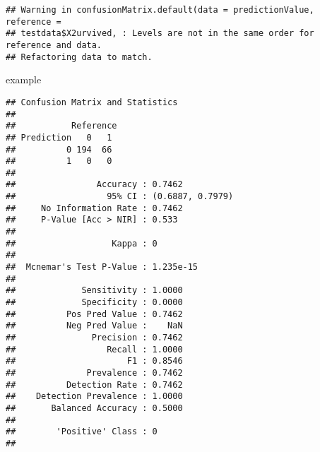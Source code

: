 \documentclass[
]{article}
\newenvironment{Shaded}{\begin{snugshade}}{\end{snugshade}}
\newcommand{\AttributeTok}[1]{\textcolor[rgb]{0.13,0.29,0.53}{#1}}
\newcommand{\DecValTok}[1]{\textcolor[rgb]{0.00,0.00,0.81}{#1}}
\newcommand{\FloatTok}[1]{\textcolor[rgb]{0.00,0.00,0.81}{#1}}
\newcommand{\FunctionTok}[1]{\textcolor[rgb]{0.13,0.29,0.53}{\textbf{#1}}}
\newcommand{\NormalTok}[1]{#1}
\newcommand{\OtherTok}[1]{\textcolor[rgb]{0.56,0.35,0.01}{#1}}
\newcommand{\SpecialCharTok}[1]{\textcolor[rgb]{0.81,0.36,0.00}{\textbf{#1}}}
\newcommand{\StringTok}[1]{\textcolor[rgb]{0.31,0.60,0.02}{#1}}
\begin{document}
\begin{Shaded}
\end{Shaded}

\begin{verbatim}
## Warning in confusionMatrix.default(data = predictionValue, reference =
## testdata$X2urvived, : Levels are not in the same order for reference and data.
## Refactoring data to match.
\end{verbatim}

\begin{Shaded}
\begin{Highlighting}[]
\NormalTok{  example}
\end{Highlighting}
\end{Shaded}

\begin{verbatim}
## Confusion Matrix and Statistics
## 
##           Reference
## Prediction   0   1
##          0 194  66
##          1   0   0
##                                           
##                Accuracy : 0.7462          
##                  95% CI : (0.6887, 0.7979)
##     No Information Rate : 0.7462          
##     P-Value [Acc > NIR] : 0.533           
##                                           
##                   Kappa : 0               
##                                           
##  Mcnemar's Test P-Value : 1.235e-15       
##                                           
##             Sensitivity : 1.0000          
##             Specificity : 0.0000          
##          Pos Pred Value : 0.7462          
##          Neg Pred Value :    NaN          
##               Precision : 0.7462          
##                  Recall : 1.0000          
##                      F1 : 0.8546          
##              Prevalence : 0.7462          
##          Detection Rate : 0.7462          
##    Detection Prevalence : 1.0000          
##       Balanced Accuracy : 0.5000          
##                                           
##        'Positive' Class : 0               
## 
\end{verbatim}
\end{document}
